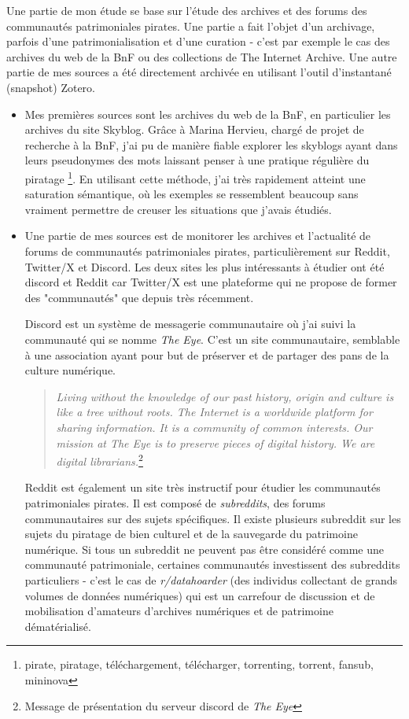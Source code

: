 Une partie de mon étude se base sur l'étude des archives et des forums des communautés patrimoniales pirates. Une partie a fait l'objet d'un archivage, parfois d'une patrimonialisation et d'une curation - c'est par exemple le cas des archives du web de la BnF ou des collections de The Internet Archive. Une autre partie de mes sources a été directement archivée en utilisant l'outil d'instantané (snapshot) Zotero.
\begin{itemize}
    \item Mes premières sources sont les archives du web de la BnF, en particulier les archives du site Skyblog. Grâce à Marina Hervieu, chargé de projet de recherche à la BnF, j'ai pu de manière fiable explorer les skyblogs ayant dans leurs pseudonymes des mots laissant penser à une pratique régulière du piratage \footnote{pirate, piratage, téléchargement, télécharger, torrenting, torrent, fansub, mininova}. En utilisant cette méthode, j'ai très rapidement atteint une saturation sémantique, où les exemples se ressemblent beaucoup sans vraiment permettre de creuser les situations que j'avais étudiés.
    
    \item Une partie de mes sources est de monitorer les archives et l'actualité de forums de communautés patrimoniales pirates, particulièrement sur Reddit, Twitter/X et Discord. Les deux sites les plus intéressants à étudier ont été discord et Reddit car Twitter/X est une plateforme qui ne propose de former des "communautés" que depuis très récemment. 
    
    \subitem Discord est un système de messagerie communautaire où j'ai suivi la communauté qui se nomme \textit{The Eye}. C'est un site communautaire, semblable à une association ayant pour but de préserver et de partager des pans de la culture numérique. 

    \begin{quote}
        \textit{Living without the knowledge of our past history, origin and culture is like a tree without roots. The Internet is a worldwide platform for sharing information. It is a community of common interests.
        Our mission at The Eye is to preserve pieces of digital history. We are digital librarians.}\footnote{Message de présentation du serveur discord de \textit{The Eye}}
    \end{quote}

    \subitem Reddit est également un site très instructif pour étudier les communautés patrimoniales pirates. Il est composé de \textit{subreddits}, des forums communautaires sur des sujets spécifiques. Il existe plusieurs subreddit sur les sujets du piratage de bien culturel et de la sauvegarde du patrimoine numérique. Si tous un subreddit ne peuvent pas être considéré comme une communauté patrimoniale, certaines communautés investissent des subreddits particuliers - c'est le cas de \textit{r/datahoarder} (des individus collectant de grands volumes de données numériques) qui est un carrefour de discussion et de mobilisation d'amateurs d'archives numériques et de patrimoine dématérialisé. 


\end{itemize}
